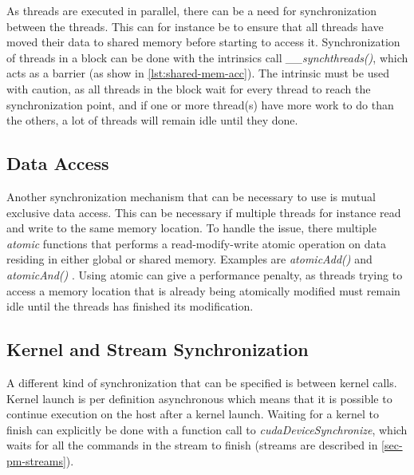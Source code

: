As threads are executed in parallel, there can be a need for synchronization between the threads.
This can for instance be to ensure that all threads have moved their data to shared memory before starting to access it.
Synchronization of threads in a block can be done with the intrinsics call \textit{\_\_synchthreads()}, which acts as a barrier (as show in \autoref{lst:shared-mem-acc}).
The intrinsic must be used with caution, as all threads in the block wait for every thread to reach the synchronization point, and if one or more thread(s) have more work to do than the others, a lot of threads will remain idle until they done.

\subsection{Data Access}
Another synchronization mechanism that can be necessary to use is mutual exclusive data access.
This can be necessary if multiple threads for instance read and write to the same memory location.
To handle the issue, there multiple \textit{atomic} functions that performs a read-modify-write atomic operation on data residing in either global or shared memory.
Examples are \textit{atomicAdd()} and \textit{atomicAnd()} \cite{cuda:programmingguide}.
Using atomic can give a performance penalty, as threads trying to access a memory location that is already being atomically modified must remain idle until the threads has finished its modification.

\subsection{Kernel and Stream Synchronization}
A different kind of synchronization that can be specified is between kernel calls.
Kernel launch is per definition asynchronous which means that it is possible to continue execution on the host after a kernel launch.
Waiting for a kernel to finish can explicitly be done with a function call to \textit{cudaDeviceSynchronize}, which waits for all the commands in the stream to finish (streams are described in \autoref{sec-pm-streams}).

